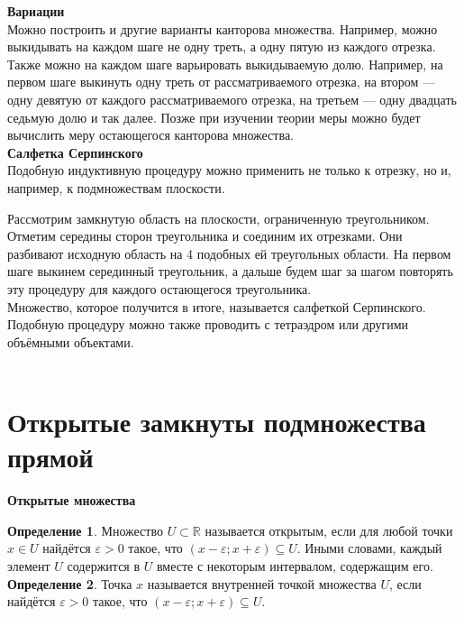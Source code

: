 \documentclass{report}
\begin{document}
\textbf{Вариации}\\

Можно построить и другие варианты канторова множества. Например, можно выкидывать на каждом шаге не одну треть, а одну пятую из каждого отрезка. Также можно на каждом шаге варьировать выкидываемую долю. Например, на первом шаге выкинуть одну треть от рассматриваемого отрезка, на втором — одну девятую от каждого рассматриваемого отрезка, на третьем — одну двадцать седьмую долю и так далее. Позже при изучении теории меры можно будет вычислить меру остающегося канторова множества.\\

\textbf{Салфетка Серпинского}\\

Подобную индуктивную процедуру можно применить не только к отрезку, но и, например, к подмножествам плоскости.


Рассмотрим замкнутую область на плоскости, ограниченную треугольником. Отметим середины сторон треугольника и соединим их отрезками. Они разбивают исходную область на 4 подобных ей треугольных области. На первом шаге выкинем серединный треугольник, а дальше будем шаг за шагом повторять эту процедуру для каждого остающегося треугольника.\\

Множество, которое получится в итоге, называется салфеткой Серпинского.\\

Подобную процедуру можно также проводить с тетраэдром или другими объёмными объектами. \\

\\

\section{Открытые замкнуты подмножества прямой}

\textbf{Открытые множества}

\textbf{Определение 1}. Множество $U \subset \mathbb{R}$ называется открытым, если для любой точки $x \in U$ найдётся $\varepsilon > 0$ такое, что $(x-\varepsilon; x+\varepsilon) \subseteq U$. Иными словами, каждый элемент $U$ содержится в $U$ вместе с некоторым интервалом, содержащим его.\\

\textbf{Определение 2}. Точка $x$ называется внутренней точкой множества $U$, если найдётся $\varepsilon > 0$ такое, что $(x-\varepsilon; x+\varepsilon) \subseteq U$.\\
\end{document}
